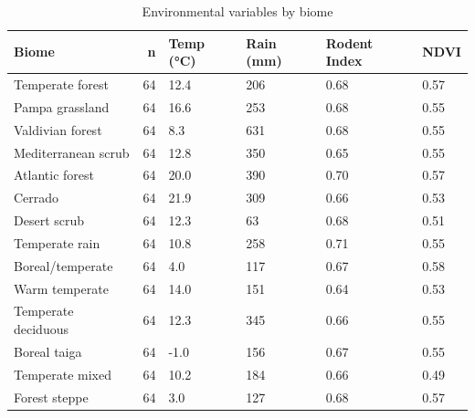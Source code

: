 \begin{table}[htbp]
\caption{Environmental variables by biome}
\label{tab:env_biome}
\begin{tabular}{lrllll}
\toprule
Biome & n & Temp (°C) & Rain (mm) & Rodent Index & NDVI \\
\midrule
Temperate forest & 64 & 12.4 & 206 & 0.68 & 0.57 \\
Pampa grassland & 64 & 16.6 & 253 & 0.68 & 0.55 \\
Valdivian forest & 64 & 8.3 & 631 & 0.68 & 0.55 \\
Mediterranean scrub & 64 & 12.8 & 350 & 0.65 & 0.55 \\
Atlantic forest & 64 & 20.0 & 390 & 0.70 & 0.57 \\
Cerrado & 64 & 21.9 & 309 & 0.66 & 0.53 \\
Desert scrub & 64 & 12.3 & 63 & 0.68 & 0.51 \\
Temperate rain & 64 & 10.8 & 258 & 0.71 & 0.55 \\
Boreal/temperate & 64 & 4.0 & 117 & 0.67 & 0.58 \\
Warm temperate & 64 & 14.0 & 151 & 0.64 & 0.53 \\
Temperate deciduous & 64 & 12.3 & 345 & 0.66 & 0.55 \\
Boreal taiga & 64 & -1.0 & 156 & 0.67 & 0.55 \\
Temperate mixed & 64 & 10.2 & 184 & 0.66 & 0.49 \\
Forest steppe & 64 & 3.0 & 127 & 0.68 & 0.57 \\
\bottomrule
\end{tabular}
\end{table}
